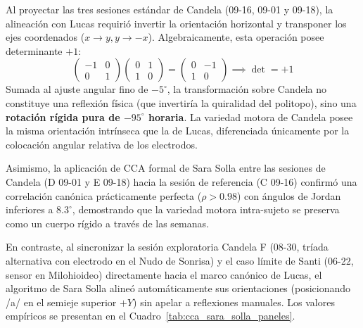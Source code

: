 \documentclass[11pt,a4paper]{article}
\begin{document}
Al proyectar las tres sesiones estándar de Candela (09-16, 09-01 y 09-18), la alineación con Lucas requirió invertir la orientación horizontal y transponer los ejes coordenados ($x \to y, y \to -x$). Algebraicamente, esta operación posee determinante $+1$:
\begin{equation}
    \begin{pmatrix} -1 & 0 \\ 0 & 1 \end{pmatrix} \begin{pmatrix} 0 & 1 \\ 1 & 0 \end{pmatrix} = \begin{pmatrix} 0 & -1 \\ 1 & 0 \end{pmatrix} \implies \det = +1
\end{equation}
Sumada al ajuste angular fino de $-5^\circ$, la transformación sobre Candela no constituye una reflexión física (que invertiría la quiralidad del politopo), sino una \textbf{rotación rígida pura de $-95^\circ$ horaria}. La variedad motora de Candela posee la misma orientación intrínseca que la de Lucas, diferenciada únicamente por la colocación angular relativa de los electrodos.

Asimismo, la aplicación de CCA formal de Sara Solla entre las sesiones de Candela (D 09-01 y E 09-18) hacia la sesión de referencia (C 09-16) confirmó una correlación canónica prácticamente perfecta ($\rho > 0.98$) con ángulos de Jordan inferiores a $8.3^\circ$, demostrando que la variedad motora intra-sujeto se preserva como un cuerpo rígido a través de las semanas.

En contraste, al sincronizar la sesión exploratoria Candela F (08-30, tríada alternativa con electrodo en el Nudo de Sonrisa) y el caso límite de Santi (06-22, sensor en Milohioideo) directamente hacia el marco canónico de Lucas, el algoritmo de Sara Solla alineó automáticamente sus orientaciones (posicionando /a/ en el semieje superior $+Y$) sin apelar a reflexiones manuales. Los valores empíricos se presentan en el Cuadro~\ref{tab:cca_sara_solla_paneles}.
\end{document}

